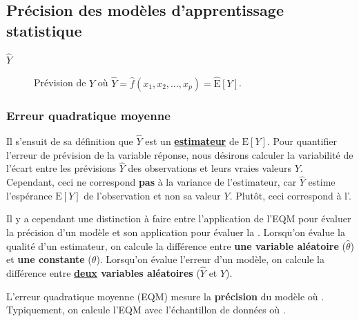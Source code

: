 \documentclass[french]{article}
\begin{document}
\begin{multicols*}{2}
\subsection{Précision des modèles d'apprentissage statistique}\label{subsec:PrecisionModel}
\begin{distributions}[Notation]
\begin{description}
	\item[$\hat{Y}$]	Prévision de $Y$ où $\hat{Y} = \hat{f}(x_{1}, x_{2}, \dots, x_{p}) = \hat{\text{E}}[Y]$.
\end{description}
\end{distributions}


\subsubsection{Erreur quadratique moyenne}\label{subsubsec:EQMPrecisionModel}
\begin{rappel_enhanced}[Contexte]
Il s'ensuit de sa définition que $\hat{Y}$ est un \textbf{\textcolor{bleudefrance}{\hyperref[subsec:estimationPonctuelle]{estimateur}}} de $\text{E}[Y]$. Pour quantifier l'erreur de prévision de la variable réponse, nous désirons calculer la variabilité de l'écart entre les prévisions $\hat{Y}$ des observations et leurs vraies valeurs $Y$. Cependant, ceci ne correspond \textbf{pas} à la variance de l'estimateur, car $\hat{Y}$ estime l'espérance $\text{E}[Y]$ de l'observation et non sa valeur $Y$. Plutôt, ceci correspond à l'\textit{\underline{}}.

\bigskip

Il y a cependant une distinction à faire entre l'application de l'EQM pour évaluer la précision d'un modèle et son application pour évaluer la \textit{\underline{}}. Lorsqu'on évalue la qualité d'un estimateur, on calcule la différence entre \textbf{une variable aléatoire} ($\hat{\theta}$) et \textbf{une constante} ($\theta$). Lorsqu'on évalue l'erreur d'un modèle, on calcule la différence entre \textbf{\underline{deux} variables aléatoires} ($\hat{Y}$ et $Y$).
\end{rappel_enhanced}

\bigskip

L'erreur quadratique moyenne (EQM) mesure la \textbf{précision} du modèle où . Typiquement, on calcule l'EQM avec l'échantillon de données où .


\end{multicols*}
\end{document}
